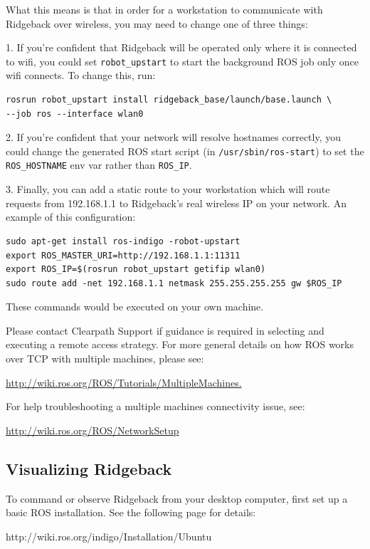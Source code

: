\documentclass[]{clearpath-latex/clearpath-manual}
\begin{document}
What this means is that in order for a workstation to communicate with Ridgeback over wireless, you may need to
change one of three things:

1. If you’re confident that Ridgeback will be operated only where it is connected to wifi, you could set
\lstinline{robot_upstart} to start the background ROS job only once wifi connects. To change this, run:

\begin{lstlisting}
rosrun robot_upstart install ridgeback_base/launch/base.launch \
--job ros --interface wlan0
\end{lstlisting}


2. If you’re confident that your network will resolve hostnames correctly, you could change the generated
ROS start script (in \lstinline{/usr/sbin/ros-start}) to set the \lstinline{ROS_HOSTNAME} env var rather than \lstinline{ROS_IP}.

3. Finally, you can add a static route to your workstation which will route requests from 192.168.1.1 to
Ridgeback's real wireless IP on your network. An example of this configuration:

\begin{lstlisting}
sudo apt-get install ros-indigo -robot-upstart
export ROS_MASTER_URI=http://192.168.1.1:11311
export ROS_IP=$(rosrun robot_upstart getifip wlan0)
sudo route add -net 192.168.1.1 netmask 255.255.255.255 gw $ROS_IP
\end{lstlisting}

These commands would be executed on your own machine.

Please contact Clearpath Support if guidance is required in selecting and executing a remote access strategy.
For more general details on how ROS works over TCP with multiple machines, please see:

\url{http://wiki.ros.org/ROS/Tutorials/MultipleMachines.}

For help troubleshooting a multiple machines connectivity issue, see:

\url{http://wiki.ros.org/ROS/NetworkSetup}


\subsection{Visualizing Ridgeback}

To command or observe Ridgeback from your desktop computer, first set up a basic ROS installation.  See the following page for details:

http://wiki.ros.org/indigo/Installation/Ubuntu
\end{document}
